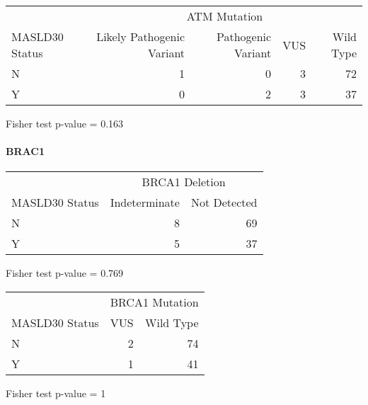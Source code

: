 \documentclass[
]{article}
\begin{document}
\begingroup
\fontsize{12.0pt}{14.4pt}\selectfont
\setlength{\LTpost}{0mm}
\begin{longtable}{l|rrrr}
\toprule
 & \multicolumn{4}{c}{ATM Mutation} \\ 
\cmidrule(lr){2-5}
MASLD30 Status & Likely Pathogenic Variant & Pathogenic Variant & VUS & Wild Type \\ 
\midrule\addlinespace[2.5pt]
N & 1 & 0 & 3 & 72 \\ 
Y & 0 & 2 & 3 & 37 \\ 
\bottomrule
\end{longtable}
\begin{minipage}{\linewidth}
Fisher test p-value =  0.163\\
\end{minipage}
\endgroup

\pagebreak

\hypertarget{brac1}{%
\paragraph{BRAC1}\label{brac1}}

\begingroup
\fontsize{12.0pt}{14.4pt}\selectfont
\setlength{\LTpost}{0mm}
\begin{longtable}{l|rr}
\toprule
 & \multicolumn{2}{c}{BRCA1 Deletion} \\ 
\cmidrule(lr){2-3}
MASLD30 Status & Indeterminate & Not Detected \\ 
\midrule\addlinespace[2.5pt]
N & 8 & 69 \\ 
Y & 5 & 37 \\ 
\bottomrule
\end{longtable}
\begin{minipage}{\linewidth}
Fisher test p-value =  0.769\\
\end{minipage}
\endgroup

\begingroup
\fontsize{12.0pt}{14.4pt}\selectfont
\setlength{\LTpost}{0mm}
\begin{longtable}{l|rr}
\toprule
 & \multicolumn{2}{c}{BRCA1 Mutation} \\ 
\cmidrule(lr){2-3}
MASLD30 Status & VUS & Wild Type \\ 
\midrule\addlinespace[2.5pt]
N & 2 & 74 \\ 
Y & 1 & 41 \\ 
\bottomrule
\end{longtable}
\begin{minipage}{\linewidth}
Fisher test p-value =  1\\
\end{minipage}
\endgroup
\pagebreak
\end{document}
